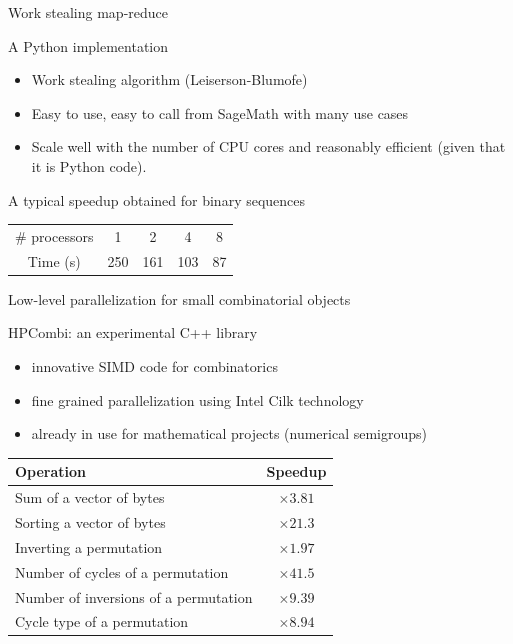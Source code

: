 \documentclass{beamer}
\begin{document}
\begin{frame}{Work stealing map-reduce}

  \begin{block}{A Python implementation}
    \begin{itemize}
    \item Work stealing algorithm (Leiserson-Blumofe)
    \item Easy to use, easy to call from SageMath with many use cases
    \item Scale well with the number of CPU cores and reasonably efficient (given that it is Python code).
    \end{itemize}
  \end{block}

  A typical speedup obtained for binary sequences 
  \begin{center}\begin{tabular}{c|cccc}
    \# processors & 1 & 2 & 4 & 8\\
    Time (s) & 250 & 161 & 103 & 87
  \end{tabular}\end{center}
 
\end{frame}

\begin{frame}{Low-level parallelization for small combinatorial objects}

  \begin{block}{HPCombi: an experimental C++ library}
  \begin{itemize}
  \item innovative SIMD code for combinatorics
  \item fine grained parallelization using Intel Cilk technology
  \item already in use for mathematical projects (numerical semigroups)
  \end{itemize}
  \end{block}

  \begin{center}\begin{tabular}{l|c}
  Operation & Speedup \\\hline
  Sum of a vector of bytes & $\times 3.81$\\
  Sorting a vector of bytes& $\times 21.3$\\
  Inverting a permutation& $\times 1.97$\\
  Number of cycles of a permutation& $\times 41.5$\\
  Number of inversions of a permutation& $\times 9.39$\\
  Cycle type of a permutation& $\times 8.94$\\
  \end{tabular}\end{center}

\end{frame}
\end{document}
